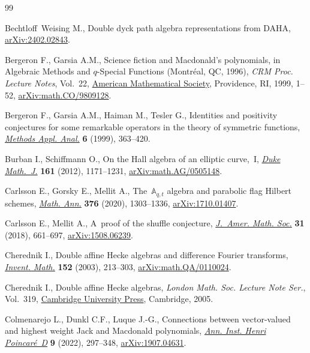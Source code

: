\documentclass[10pt,a4paper]{amsart}
\numberwithin{equation}{section}
\theoremstyle{definition}
\begin{document}
\begin{thebibliography}{99}
\footnotesize\itemsep=0pt

Bechtloff~Weising M., Double dyck path algebra representations from {DAHA},
 \href{http://arxiv.org/abs/2402.02843}{arXiv:2402.02843}.

Bergeron F., Garsia A.M., Science fiction and {M}acdonald's polynomials, in
 Algebraic {M}ethods and {$q$}\nobreakdash-{S}pecial {F}unctions ({M}ontr\'eal, {QC},
 1996), \textit{CRM Proc. Lecture Notes}, Vol.~22,
 \href{https://doi.org/10.1090/crmp/022/01}{American Mathematical Society},
 Providence, RI, 1999, 1--52,
 \href{http://arxiv.org/abs/math.CO/9809128}{arXiv:math.CO/9809128}.

Bergeron F., Garsia A.M., Haiman M., Tesler G., Identities and positivity
 conjectures for some remarkable operators in the theory of symmetric
 functions, \href{https://doi.org/10.4310/MAA.1999.v6.n3.a7}{\textit{Methods
 Appl. Anal.}} \textbf{6} (1999), 363--420.

Burban I., Schiffmann O., On the {H}all algebra of an elliptic curve,~{I},
 \href{https://doi.org/10.1215/00127094-1593263}{\textit{Duke Math.~J.}}
 \textbf{161} (2012), 1171--1231,
 \href{http://arxiv.org/abs/math/0505148}{arXiv:math.AG/0505148}.

Carlsson E., Gorsky E., Mellit A., The~{$\mathbb{A}_{q,t}$} algebra and
 parabolic flag {H}ilbert schemes,
 \href{https://doi.org/10.1007/s00208-019-01898-1}{\textit{Math. Ann.}}
 \textbf{376} (2020), 1303--1336,
 \href{http://arxiv.org/abs/1710.01407}{arXiv:1710.01407}.

Carlsson E., Mellit A., A~proof of the shuffle conjecture,
 \href{https://doi.org/10.1090/jams/893}{\textit{J.~Amer. Math. Soc.}}
 \textbf{31} (2018), 661--697,
 \href{http://arxiv.org/abs/1508.06239}{arXiv:1508.06239}.

Cherednik I., Double affine {H}ecke algebras and difference {F}ourier
 transforms, \href{https://doi.org/10.1007/s00222-002-0240-0}{\textit{Invent.
 Math.}} \textbf{152} (2003), 213--303,
 \href{http://arxiv.org/abs/math.QA/0110024}{arXiv:math.QA/0110024}.

Cherednik I., Double affine {H}ecke algebras, \textit{London Math. Soc. Lecture
 Note Ser.}, Vol.~319,
 \href{https://doi.org/10.1017/CBO9780511546501}{Cambridge University Press},
 Cambridge, 2005.

Colmenarejo L., Dunkl C.F., Luque J.-G., Connections between vector-valued and
 highest weight {J}ack and {M}acdonald polynomials,
 \href{https://doi.org/10.4171/aihpd/119}{\textit{Ann. Inst. Henri
 Poincar\'e~D}} \textbf{9} (2022), 297--348,
 \href{http://arxiv.org/abs/1907.04631}{arXiv:1907.04631}.


\end{thebibliography}
\end{document}
